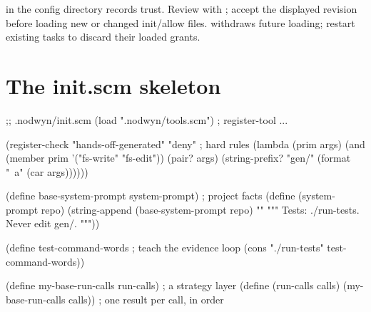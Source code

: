  in the config directory records trust. Review with
; accept the displayed revision before loading
new or changed init/allow files.  withdraws future loading;
restart existing tasks to discard their loaded grants.

\section*{The init.scm skeleton}

\begin{scm}
;; .nodwyn/init.scm
(load ".nodwyn/tools.scm")                   ; register-tool ...

(register-check "hands-off-generated" "deny" ; hard rules
  (lambda (prim args)
    (and (member prim '("fs-write" "fs-edit"))
         (pair? args)
         (string-prefix? "gen/" (format "~a" (car args))))))

(define base-system-prompt system-prompt)    ; project facts
(define (system-prompt repo)
  (string-append (base-system-prompt repo) "\n\n"
    """
    Tests: ./run-tests. Never edit gen/.
    """))

(define test-command-words                   ; teach the evidence loop
  (cons "./run-tests" test-command-words))

(define my-base-run-calls run-calls)         ; a strategy layer
(define (run-calls calls)
  (my-base-run-calls calls))                 ; one result per call, in order
\end{scm}
